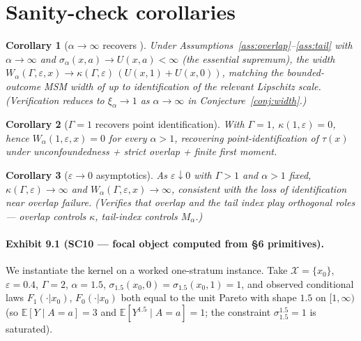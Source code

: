 \documentclass[11pt]{article}
\newcommand{\E}{\mathbb{E}}
\theoremstyle{definition}
\theoremstyle{plain}
\newtheorem{corollary}{Corollary}
\theoremstyle{remark}
\begin{document}
\section{Sanity-check corollaries}

\begin{corollary}[$\alpha \to \infty$ recovers \citet{YadlowskyNamkoongBasuDuchiTian2022}]\label{cor:sanity-alpha-inf}
Under Assumptions~\ref{ass:overlap}--\ref{ass:tail} with $\alpha \to \infty$ and $\sigma_\alpha(x,a) \to U(x,a) < \infty$ (the essential supremum), the width $W_\alpha(\Gamma,\varepsilon,x) \to \kappa(\Gamma,\varepsilon)\,(U(x,1) + U(x,0))$, matching the bounded-outcome MSM width of \citet*{YadlowskyNamkoongBasuDuchiTian2022} up to identification of the relevant Lipschitz scale. (Verification reduces to $\xi_\alpha \to 1$ as $\alpha \to \infty$ in Conjecture~\ref{conj:width}.)
\end{corollary}

\begin{corollary}[$\Gamma = 1$ recovers point identification]\label{cor:sanity-gamma-1}
With $\Gamma = 1$, $\kappa(1,\varepsilon) = 0$, hence $W_\alpha(1,\varepsilon,x) = 0$ for every $\alpha > 1$, recovering point-identification of $\tau(x)$ under unconfoundedness + strict overlap + finite first moment.
\end{corollary}

\begin{corollary}[$\varepsilon \to 0$ asymptotics]\label{cor:sanity-eps-0}
As $\varepsilon \downarrow 0$ with $\Gamma > 1$ and $\alpha > 1$ fixed, $\kappa(\Gamma,\varepsilon) \to \infty$ and $W_\alpha(\Gamma,\varepsilon,x) \to \infty$, consistent with the loss of identification near overlap failure. (Verifies that overlap and the tail index play orthogonal roles — overlap controls $\kappa$, tail-index controls $M_\alpha$.)
\end{corollary}

\paragraph{Exhibit 9.1 (SC10 — focal object computed from \S6 primitives).}
We instantiate the kernel on a worked one-stratum instance. Take $\mathcal{X} = \{x_0\}$, $\varepsilon = 0.4$, $\Gamma = 2$, $\alpha = 1.5$, $\sigma_{1.5}(x_0, 0) = \sigma_{1.5}(x_0, 1) = 1$, and observed conditional laws $F_1(\cdot|x_0)$, $F_0(\cdot|x_0)$ both equal to the unit Pareto with shape $1.5$ on $[1, \infty)$ (so $\E[Y\mid A=a] = 3$ and $\E[Y^{1.5}\mid A=a] = 1$; the constraint $\sigma_{1.5}^{1.5} = 1$ is saturated).
\end{document}
